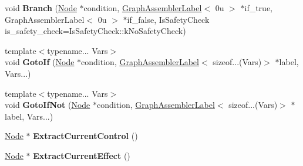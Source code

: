 \begin{DoxyCompactItemize}
\item 
\mbox{\label{classv8_1_1internal_1_1compiler_1_1GraphAssembler_ad267812d253686fd05773af1d46266c2}} 
void {\bfseries Branch} (\mbox{\hyperlink{classv8_1_1internal_1_1compiler_1_1Node}{Node}} $\ast$condition, \mbox{\hyperlink{classv8_1_1internal_1_1compiler_1_1GraphAssemblerLabel}{Graph\+Assembler\+Label}}$<$ 0u $>$ $\ast$if\+\_\+true, Graph\+Assembler\+Label$<$ 0u $>$ $\ast$if\+\_\+false, Is\+Safety\+Check is\+\_\+safety\+\_\+check=\+Is\+Safety\+Check\+::k\+No\+Safety\+Check)
\item 
\mbox{\label{classv8_1_1internal_1_1compiler_1_1GraphAssembler_a2abbf24389a11b0a17ddc77951fd3c75}} 
{\footnotesize template$<$typename... Vars$>$ }\\void {\bfseries Goto\+If} (\mbox{\hyperlink{classv8_1_1internal_1_1compiler_1_1Node}{Node}} $\ast$condition, \mbox{\hyperlink{classv8_1_1internal_1_1compiler_1_1GraphAssemblerLabel}{Graph\+Assembler\+Label}}$<$ sizeof...(Vars)$>$ $\ast$label, Vars...)
\item 
\mbox{\label{classv8_1_1internal_1_1compiler_1_1GraphAssembler_ad52f51bdec47766ca8d20c2ad3afa0e8}} 
{\footnotesize template$<$typename... Vars$>$ }\\void {\bfseries Goto\+If\+Not} (\mbox{\hyperlink{classv8_1_1internal_1_1compiler_1_1Node}{Node}} $\ast$condition, \mbox{\hyperlink{classv8_1_1internal_1_1compiler_1_1GraphAssemblerLabel}{Graph\+Assembler\+Label}}$<$ sizeof...(Vars)$>$ $\ast$label, Vars...)
\item 
\mbox{\label{classv8_1_1internal_1_1compiler_1_1GraphAssembler_a4f4c4549e4d7bec2cf0d6b0d05cb56d1}} 
\mbox{\hyperlink{classv8_1_1internal_1_1compiler_1_1Node}{Node}} $\ast$ {\bfseries Extract\+Current\+Control} ()
\item 
\mbox{\label{classv8_1_1internal_1_1compiler_1_1GraphAssembler_a32168a75e4a4bf19837221e7deb4cbc8}} 
\mbox{\hyperlink{classv8_1_1internal_1_1compiler_1_1Node}{Node}} $\ast$ {\bfseries Extract\+Current\+Effect} ()
\end{DoxyCompactItemize}
